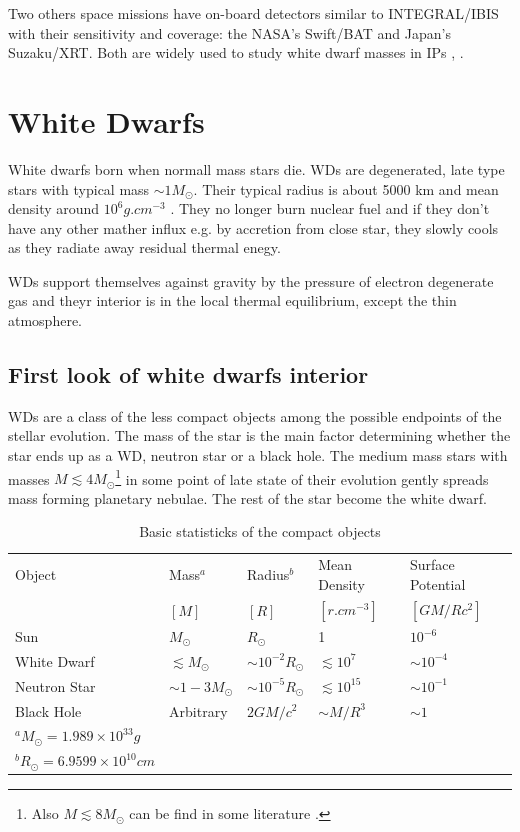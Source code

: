 \documentclass[oneside,a4paper,11pt]{report}
\begin{document}
Two others space missions have on-board detectors similar to INTEGRAL/IBIS with their sensitivity 
and coverage: the NASA's Swift/BAT and Japan's Suzaku/XRT. Both are widely used to study white dwarf 
masses in IPs \citet{2009A&A...496..121B}, \citet{2010A&A...520A..25Y}.    



\chapter{White Dwarfs}
White dwarfs born when normall mass stars die. WDs are degenerated, late type stars with typical mass $\sim 1 M_{\odot}$. Their typical radius is about
 5000 km and mean density around $10^6 g.cm^{-3}$ \citet{2004bhwd.book.....S}. They no longer burn nuclear fuel and
if they don't have any other mather influx e.g. by accretion from close star, they slowly cools as they radiate
away residual thermal enegy.

WDs support themselves against gravity by the pressure of electron degenerate gas and theyr interior is in the local thermal 
equilibrium, except the thin atmosphere.  

\section{First look of white dwarfs interior}
WDs are a class of the less compact objects among the possible endpoints of the stellar evolution. 
The mass of the star is the main factor determining whether the star ends up as a WD, neutron star or a black hole.
The medium mass stars with masses $M \lesssim  4M_{\odot}$\footnote{Also $M \lesssim  8M_{\odot}$ can be find in 
some literature \citet{padm_vII}.} in some point of late state of their evolution gently spreads mass
 forming planetary nebulae. The rest of the star become the white dwarf.  

\begin{table}[hbt!]
\caption{Basic statisticks of the compact objects \citet{2004bhwd.book.....S}}
\centering
\begin{tabular}{lllll}
\hline
\hline
Object & Mass$^a$ & Radius$^b$ & Mean Density & Surface Potential  \\
       & $[M]$ & $[R]$ & $[r.cm^{-3}]$& $[GM/Rc^2]$                    \\
\hline
Sun         & $M_{\odot}$            & $R_{\odot}$             &1                  &$10^{-6}$ \\
White Dwarf & $\lesssim M_{\odot}$   & $\sim 10^{-2}R_{\odot}$ & $\lesssim 10^7$   &$\sim 10^{-4}$ \\
Neutron Star& $\sim1-3M_{\odot}$     & $\sim 10^{-5}R_{\odot}$ & $\lesssim 10^{15}$& $\sim 10^{-1}$\\
Black Hole  & Arbitrary              & $2GM/c^2$               & $\sim M/R^3$      & $\sim1$\\
\hline
\footnotesize
$^a M_{\odot}=1.989 \times 10^{33} g$ &&&& \\
\footnotesize
$^b R_{\odot}=6.9599 \times 10^{10} cm$ &&&& \\
\end{tabular}
\label{comobj1}
\end{table}
\end{document}
